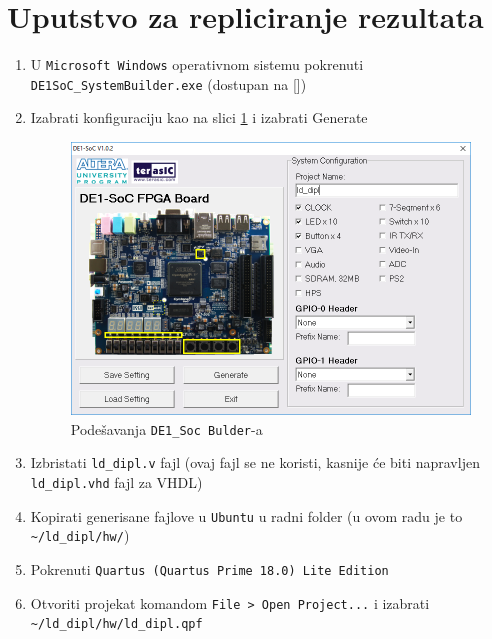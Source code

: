 \newcommand\tab[1][1cm]{\hspace*{#1}}
\section{Uputstvo za repliciranje rezultata}

\begin{enumerate}

\subsection{Projektovanje u Quartus-u}
\item U \texttt{Microsoft Windows} operativnom sistemu pokrenuti \texttt{DE1SoC\_SystemBuilder.exe} (dostupan na [])
\item Izabrati konfiguraciju kao na slici \ref{slika:sb} i izabrati Generate\\
\begin{figure}[h!]
\centering
\includegraphics[scale=0.6]{img/DE1SoC_SystemBuilder.png}
\caption{Podešavanja \texttt{DE1\_Soc Bulder}-a}
\label{slika:sb}
\end{figure}
\item  Izbristati \texttt{ld\_dipl.v} fajl (ovaj fajl se ne koristi, kasnije će biti napravljen \texttt{ld\_dipl.vhd} fajl za VHDL)
\item  Kopirati generisane fajlove u \texttt{Ubuntu} u radni folder (u ovom radu je to \texttt{\textasciitilde/ld\_dipl/hw/})
\item  Pokrenuti \texttt{Quartus (Quartus Prime 18.0) Lite Edition}
\item  Otvoriti projekat komandom \texttt{File > Open Project...} i izabrati \texttt{\textasciitilde/ld\_dipl/hw/ld\_dipl.qpf}

\end{enumerate}
